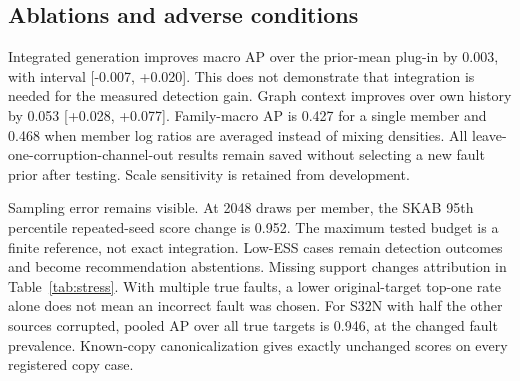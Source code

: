\documentclass[conference]{IEEEtran}
\newcommand{\1}{\mathbf{1}}
\begin{document}
\subsection{Ablations and adverse conditions}
Integrated generation improves macro AP over the prior-mean plug-in by 0.003, with interval [-0.007, +0.020]. This does not demonstrate that integration is needed for the measured detection gain. Graph context improves over own history by 0.053 [+0.028, +0.077]. Family-macro AP is 0.427 for a single member and 0.468 when member log ratios are averaged instead of mixing densities. All leave-one-corruption-channel-out results remain saved without selecting a new fault prior after testing. Scale sensitivity is retained from development.

Sampling error remains visible. At 2048 draws per member, the SKAB 95th percentile repeated-seed score change is 0.952. The maximum tested budget is a finite reference, not exact integration. Low-ESS cases remain detection outcomes and become recommendation abstentions. Missing support changes attribution in Table~\ref{tab:stress}. With multiple true faults, a lower original-target top-one rate alone does not mean an incorrect fault was chosen. For S32N with half the other sources corrupted, pooled AP over all true targets is 0.946, at the changed fault prevalence. Known-copy canonicalization gives exactly unchanged scores on every registered copy case.
\end{document}
